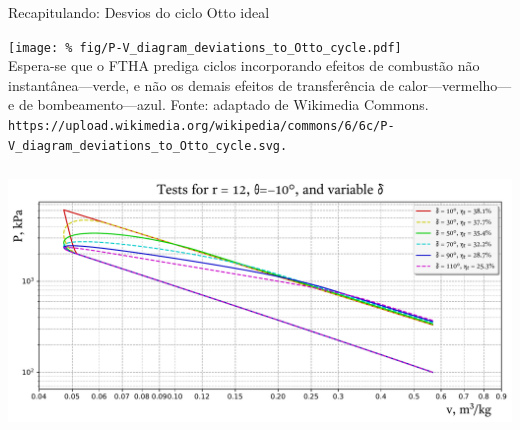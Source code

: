     \begin{frame}{Recapitulando: Desvios do ciclo Otto ideal}\vspace*{-2em}
        \begin{center}
            \texttt{[image: \%
                fig/P-V\_diagram\_deviations\_to\_Otto\_cycle.pdf]}\\
            \footnotesize \alert{Espera-se} que o FTHA prediga ciclos  incorporando  efeitos  de
                combustão não instantânea---verde, e não os demais efeitos de  transferência  de
                calor---vermelho---e  de  bombeamento---azul.  Fonte:  adaptado   de   Wikimedia
                Commons.
            {\tiny\tt https://upload.wikimedia.org/wikipedia/commons/6/6c/P-V\_diagram\_deviations\_to\_Otto\_cycle.svg.}
        \end{center}
    \end{frame}

    \begin{frame}{}\vspace*{-2em}
        \begin{center}
            \includegraphics[height=70.0mm]{fig/test_r=12,0_speed.pdf}
        \end{center}
    \end{frame}

